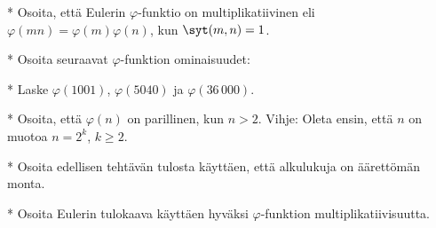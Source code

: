 \begin{kotitehtavasivu}
\begin{tehtava}
    * Osoita, että Eulerin $\varphi$-funktio on multiplikatiivinen
    eli $\varphi(mn) = \varphi(m) \varphi(n)$, kun $\syt(m, n)=1$.
\end{tehtava}

\begin{tehtava}
    *  Osoita seuraavat $\varphi$-funktion ominaisuudet:
\end{tehtava}

\begin{tehtava}
    * Laske $\varphi(1001)$, $\varphi(5040)$ ja $\varphi(36\,000)$.
\end{tehtava}

\begin{tehtava}
    * Osoita, että $\varphi(n)$ on parillinen, kun $n>2$. Vihje: Oleta ensin, että $n$ on muotoa $n=2^k$, $k\ge 2$.
\end{tehtava}

\begin{tehtava}
    * Osoita edellisen tehtävän tulosta käyttäen, että alkulukuja on äärettömän monta.
\end{tehtava}

\begin{tehtava}
    * Osoita Eulerin tulokaava käyttäen hyväksi  $\varphi$-funktion multiplikatiivisuutta.
\end{tehtava}

\end{kotitehtavasivu}
